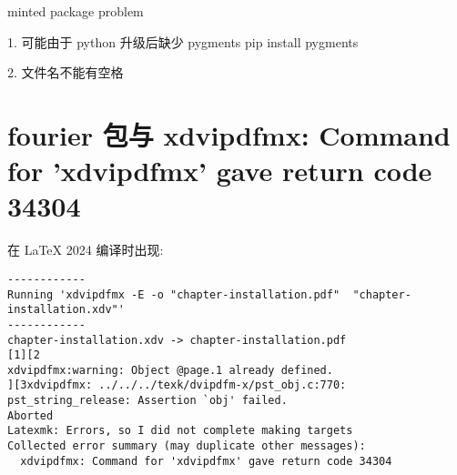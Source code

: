 minted package problem

1. 可能由于 python 升级后缺少 pygments
pip install pygments

2. 文件名不能有空格


\section{fourier 包与 xdvipdfmx: Command for 'xdvipdfmx' gave return code 34304}

在 LaTeX 2024 编译时出现:

\begin{verbatim}
------------
Running 'xdvipdfmx -E -o "chapter-installation.pdf"  "chapter-installation.xdv"'
------------
chapter-installation.xdv -> chapter-installation.pdf
[1][2
xdvipdfmx:warning: Object @page.1 already defined.
][3xdvipdfmx: ../../../texk/dvipdfm-x/pst_obj.c:770: pst_string_release: Assertion `obj' failed.
Aborted
Latexmk: Errors, so I did not complete making targets
Collected error summary (may duplicate other messages):
  xdvipdfmx: Command for 'xdvipdfmx' gave return code 34304
\end{verbatim}
